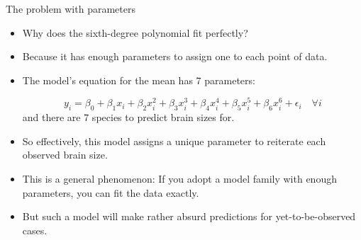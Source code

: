 \documentclass[handout]{beamer}
\begin{document}
\begin{frame}{The problem with parameters}
\scriptsize{

\begin{itemize}

\item Why does the sixth-degree polynomial fit perfectly? 
\item Because it has enough parameters to assign one to each point of data.

\item The model's equation for the mean has 7 parameters:

\begin{displaymath}
 y_i=\beta_{0}+\beta_{1}x_i +\beta_{2}x_i^2 +\beta_{3}x_i^3 +\beta_{4}x_i^4 +\beta_{5}x_i^5+\beta_{6}x_i^6+\epsilon_i \quad \forall i
\end{displaymath}
and there are 7 species to predict brain sizes for.

\item So effectively, this model assigns a unique parameter to reiterate each observed brain size.
\item This is a general phenomenon: If you adopt a model family with enough parameters, you can fit the data exactly. 
\item But such a model will make rather absurd predictions for yet-to-be-observed cases.


\end{itemize}


} 
\end{frame}
\end{document}
